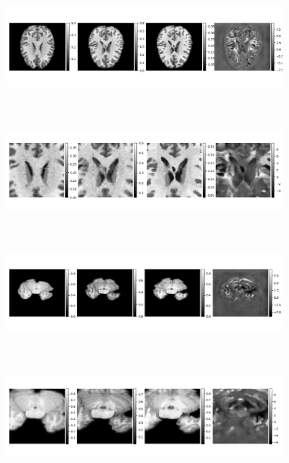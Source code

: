\documentclass[preprint,authoryear]{elsarticle}
\begin{document}
\begin{figure}
	\begin{minipage}[b]{0.9\linewidth}
		\centering
			\includegraphics[width=9cm]{Reg_Results_1.png}
	\end{minipage} \\
	\begin{minipage}[b]{0.9\linewidth}
		\centering
			\includegraphics[width=9cm]{Reg_results_1_closeups.png}
	\end{minipage}
	\\
	\begin{minipage}[b]{0.9\linewidth}
		\centering
	
			\includegraphics[width=9cm]{Reg_results_15_65.png}
	\end{minipage} \\
	\begin{minipage}[b]{0.9\linewidth}
		\centering
			\includegraphics[width=9cm]{Reg_results_15_65_closeups.png}
	\end{minipage} \\
		\begin{minipage}[b]{0.9\linewidth}
		\centering
	

\end{minipage}
\end{figure}
\end{document}
